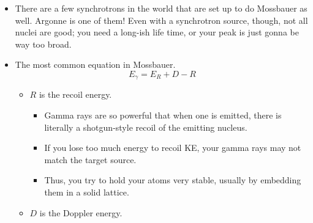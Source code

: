 \documentclass[../notes.tex]{subfiles}
\begin{document}
\begin{itemize}
\begin{table}[h!]
\begin{tabular}{ccccc}
        \end{tabular}
        \caption{Typical Mossbauer gamma ray source nuclei.}
        \label{tab:MossbauerSources}
    \end{table}
    \begin{itemize}
        \item 90\% or more of Mossbauer is done with .
        \begin{itemize}
            \item At \SI{14.4}{\kilo\electronvolt}, it's a pretty hot but not super hot gamma ray.
            \item The cobalt precursor nucleus comes from Russia, so a lot of Mossbauer spectroscopists are probably looking at very lean times right now.
        \end{itemize}
        \item {} is also pretty common.
        \begin{itemize}
            \item With respect to the precursor nucleus, 119m means a \textbf{metastable} state of tin.
        \end{itemize}
    \end{itemize}
    \item There are a few synchrotrons in the world that are set up to do Mossbauer as well. Argonne is one of them! Even with a synchrotron source, though, not all nuclei are good; you need a long-ish life time, or your peak is just gonna be way too broad.
    \item The most common equation in Mossbauer.
    \begin{equation*}
        E_\gamma = E_R+D-R
    \end{equation*}
    \begin{itemize}
        \item $R$ is the recoil energy.
        \begin{itemize}
            \item Gamma rays are so powerful that when one is emitted, there is literally a shotgun-style recoil of the emitting nucleus.
            \item If you lose too much energy to recoil KE, your gamma rays may not match the target source.
            \item Thus, you try to hold your atoms very stable, usually by embedding them in a solid lattice.
        \end{itemize}
        \item $D$ is the Doppler energy.

\end{itemize}
\end{itemize}
\end{document}
